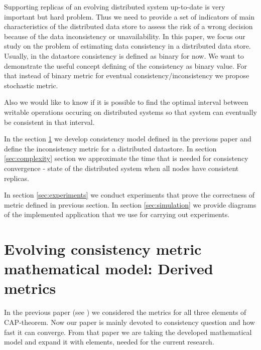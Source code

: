 \documentclass{llncs}
\begin{document}
Supporting replicas of an evolving distributed system up-to-date is very important but hard problem. Thus we need to provide a set of indicators of main characteristics of the distributed data store to assess the risk of a wrong decision because of the data inconsistency or unavailability.
In this paper, we focus our study on the problem of estimating data consistency in a distributed data store. Usually, in the datastore consistency is defined as binary for now. We want to demonstrate the useful concept defining of the consistency as binary value. 
For that instead of binary metric for eventual consistency/inconsistency we propose stochastic metric.

Also we would like to know if it is possible to find the optimal interval between writable operations occuring on distributed systems so that system can eventually be consistent in that interval.

In the section \ref{sec:model} we develop consistency model defined in the previous paper \cite{bib:prob_approach} and define the inconsistency metric for a distributed datastore.
In section \ref{sec:complexity} section we approximate the time that is needed for consistency convergence - state of the distributed system when all nodes have consistent replicas.

In section \ref{sec:experiments} we conduct experiments that prove the correctness of metric defined in previous section.
In section \ref{sec:simulation} we provide diagrams of the implemented application that we use for carrying out experiments.

\section{Evolving consistency metric mathematical model: Derived metrics}\label{sec:model}

In the previous paper (see \cite{bib:prob_approach}) we considered the metrics for all three elements of CAP-theorem.
Now our paper is mainly devoted to consistency question and how fast it can converge.
From that paper we are taking the developed mathematical model and expand it with elements, needed for the current research.
\end{document}
